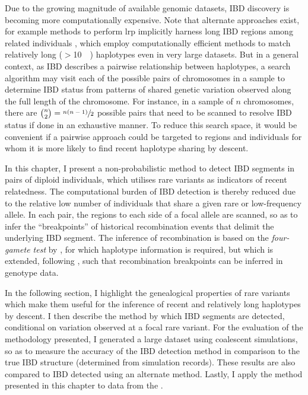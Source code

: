 Due to the growing magnitude of available genomic datasets, IBD discovery is becoming more computationally expensive.
Note that alternate approaches exist, for example methods to perform \gls{lrp} implicitly harness long IBD regions among related individuals \citep{Kong:2008gh,Palin:2011cl,loh2016fast}, which employ  computationally efficient methods to match relatively long (\eg $>$\SI{10}{\centi\morgan}) haplotypes even in very large datasets.
But in a general context, as IBD describes a pairwise relationship between  haplotypes, a search algorithm may visit each of the possible pairs of chromosomes in a sample to determine IBD status from patterns of shared genetic variation observed along the full length of the chromosome.
For instance, in a sample of $n$ chromosomes, there are ${{{n}\choose{2}} = \sfrac{n(n-1)}{2}}$ possible pairs that need to be scanned to resolve IBD status if done in an exhaustive manner.
To reduce this search space, it would be convenient if a pairwise approach could be targeted to regions and individuals for whom it is more likely to find recent haplotype sharing by descent.

In this chapter, I present a non-probabilistic method to detect IBD segments in pairs of diploid individuals, which utilises rare variants as indicators of recent relatedness.
The computational burden of IBD detection is thereby reduced due to the relative low number of individuals that share a given rare or low-frequency allele.
In each pair, the regions to each side of a focal allele are scanned, so as to infer the ``breakpoints'' of historical recombination events that delimit the underlying IBD segment.
The inference of recombination is based on the \emph{four-gamete test} by \citet{Hudson:1985wh}, for which haplotype information is required, but which is extended, following \citet{Mathieson:2014ig}, such that recombination breakpoints can be inferred in genotype data.

In the following section, I highlight the genealogical properties of rare variants which make them useful for the inference of recent and relatively long haplotypes by descent.
I then describe the method by which IBD segments are detected, conditional on variation observed at a focal rare variant.
For the evaluation of the methodology presented, I generated a large dataset using coalescent simulations, so as to measure the accuracy of the IBD detection method in comparison to the true IBD structure (determined from simulation records).
These results are also compared to IBD detected using an alternate method.
Lastly, I apply the method presented in this chapter to data from the .


